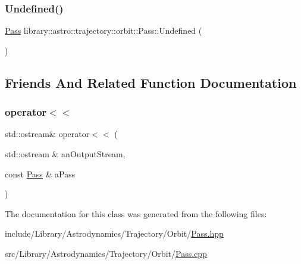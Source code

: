 \mbox{\label{classlibrary_1_1astro_1_1trajectory_1_1orbit_1_1_pass_a404433c99e31d1ab9e28e3fdd13ed221}} 
\subsubsection{\texorpdfstring{Undefined()}{Undefined()}}
{\footnotesize\ttfamily \hyperlink{classlibrary_1_1astro_1_1trajectory_1_1orbit_1_1_pass}{Pass} library\+::astro\+::trajectory\+::orbit\+::\+Pass\+::\+Undefined (\begin{DoxyParamCaption}{ }\end{DoxyParamCaption})\hspace{0.3cm}{\ttfamily [static]}}



\subsection{Friends And Related Function Documentation}
\mbox{\label{classlibrary_1_1astro_1_1trajectory_1_1orbit_1_1_pass_a62c2257085205d3c714c5ca4350f84f4}} 
\subsubsection{\texorpdfstring{operator$<$$<$}{operator<<}}
{\footnotesize\ttfamily std\+::ostream\& operator$<$$<$ (\begin{DoxyParamCaption}\item[{std\+::ostream \&}]{an\+Output\+Stream,  }\item[{const \hyperlink{classlibrary_1_1astro_1_1trajectory_1_1orbit_1_1_pass}{Pass} \&}]{a\+Pass }\end{DoxyParamCaption})\hspace{0.3cm}{\ttfamily [friend]}}



The documentation for this class was generated from the following files\+:\begin{DoxyCompactItemize}
\item 
include/\+Library/\+Astrodynamics/\+Trajectory/\+Orbit/\hyperlink{_pass_8hpp}{Pass.\+hpp}\item 
src/\+Library/\+Astrodynamics/\+Trajectory/\+Orbit/\hyperlink{_pass_8cpp}{Pass.\+cpp}\end{DoxyCompactItemize}

